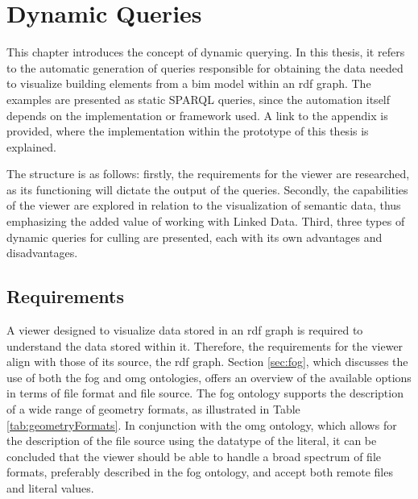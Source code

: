 \chapter{Dynamic Queries} \label{ch:dynamicQueries}
This chapter introduces the concept of dynamic querying. In this thesis, it refers to the automatic generation of queries responsible for obtaining the data needed to visualize building elements from a \ac{bim} model within an \ac{rdf} graph. The examples are presented as static SPARQL queries, since the automation itself depends on the implementation or framework used. A link to the appendix is provided, where the implementation within the prototype of this thesis is explained.

The structure is as follows: firstly, the requirements for the viewer are researched, as its functioning will dictate the output of the queries. Secondly, the capabilities of the viewer are explored in relation to the visualization of semantic data, thus emphasizing the added value of working with Linked Data. Third, three types of dynamic queries for culling are presented, each with its own advantages and disadvantages.

\section{Requirements} \label{sec:viewerRequirements}
A viewer designed to visualize data stored in an \ac{rdf} graph is required to understand the data stored within it. Therefore, the requirements for the viewer align with those of its source, the \ac{rdf} graph. Section \ref{sec:fog}, which discusses the use of both the \ac{fog} and \ac{omg} ontologies, offers an overview of the available options in terms of file format and file source. The \ac{fog} ontology supports the description of a wide range of geometry formats, as illustrated in Table \ref{tab:geometryFormats}. In conjunction with the \ac{omg} ontology, which allows for the description of the file source using the datatype of the literal, it can be concluded that the viewer should be able to handle a broad spectrum of file formats, preferably described in the \ac{fog} ontology, and accept both remote files and literal values.

